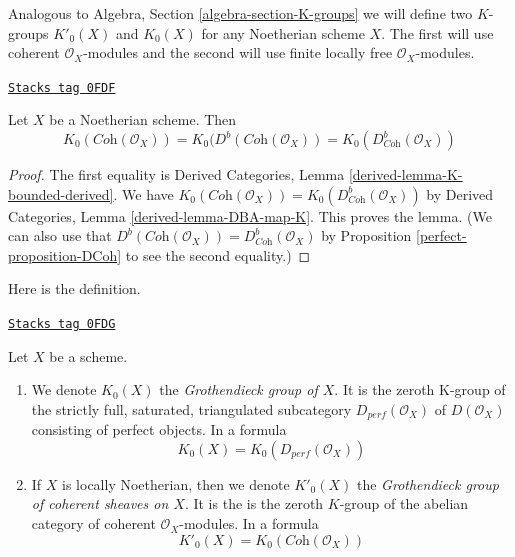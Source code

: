 \medskip\noindent
Analogous to Algebra, Section \ref{algebra-section-K-groups}
we will define two $K$-groups $K'_0(X)$ and $K_0(X)$ for any
Noetherian scheme $X$. The first will use coherent $\mathcal{O}_X$-modules
and the second will use finite locally free $\mathcal{O}_X$-modules.

\begin{lemma}
\label{perfect-lemma-Noetherian-Kprime}
\href{https://stacks.math.columbia.edu/tag/0FDF}{\texttt{Stacks tag 0FDF}}

Let $X$ be a Noetherian scheme. Then
$$
K_0(\textit{Coh}(\mathcal{O}_X)) =
K_0(D^b(\textit{Coh}(\mathcal{O}_X)) =
K_0(D^b_{\textit{Coh}}(\mathcal{O}_X))
$$
\end{lemma}

\begin{proof}

The first equality is
Derived Categories, Lemma \ref{derived-lemma-K-bounded-derived}.
We have $K_0(\textit{Coh}(\mathcal{O}_X)) =
K_0(D^b_{\textit{Coh}}(\mathcal{O}_X))$ by
Derived Categories, Lemma \ref{derived-lemma-DBA-map-K}.
This proves the lemma.
(We can also use that
$D^b(\textit{Coh}(\mathcal{O}_X)) = D^b_{\textit{Coh}}(\mathcal{O}_X)$
by Proposition \ref{perfect-proposition-DCoh} to see the second
equality.)
\end{proof}

Here is the definition.

\begin{definition}[K group]
\label{perfect-definition-K-group}
\href{https://stacks.math.columbia.edu/tag/0FDG}{\texttt{Stacks tag 0FDG}}

Let $X$ be a scheme.
\begin{enumerate}
\item We denote $K_0(X)$ the {\it Grothendieck group of $X$}. It is the
zeroth K-group of the strictly full, saturated, triangulated subcategory
$D_{perf}(\mathcal{O}_X)$ of $D(\mathcal{O}_X)$ consisting of perfect objects.
In a formula
$$
K_0(X) = K_0(D_{perf}(\mathcal{O}_X))
$$
\item If $X$ is locally Noetherian, then we denote $K'_0(X)$ the
{\it Grothendieck group of coherent sheaves on $X$}. It is the
is the zeroth $K$-group of the abelian category
of coherent $\mathcal{O}_X$-modules. In a formula
$$
K'_0(X) = K_0(\textit{Coh}(\mathcal{O}_X))
$$
\end{enumerate}
\end{definition}

